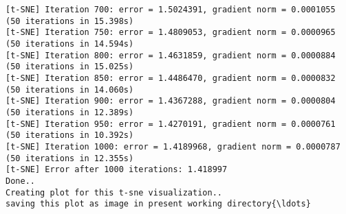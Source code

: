 \documentclass[11pt]{article}
\begin{document}
\begin{Verbatim}[commandchars=\\\{\}]
[t-SNE] Iteration 700: error = 1.5024391, gradient norm = 0.0001055 (50 iterations in 15.398s)
[t-SNE] Iteration 750: error = 1.4809053, gradient norm = 0.0000965 (50 iterations in 14.594s)
[t-SNE] Iteration 800: error = 1.4631859, gradient norm = 0.0000884 (50 iterations in 15.025s)
[t-SNE] Iteration 850: error = 1.4486470, gradient norm = 0.0000832 (50 iterations in 14.060s)
[t-SNE] Iteration 900: error = 1.4367288, gradient norm = 0.0000804 (50 iterations in 12.389s)
[t-SNE] Iteration 950: error = 1.4270191, gradient norm = 0.0000761 (50 iterations in 10.392s)
[t-SNE] Iteration 1000: error = 1.4189968, gradient norm = 0.0000787 (50 iterations in 12.355s)
[t-SNE] Error after 1000 iterations: 1.418997
Done..
Creating plot for this t-sne visualization..
saving this plot as image in present working directory{\ldots}

    \end{Verbatim}

    \begin{center}
    \end{center}
    { \hspace*{\fill} \\}
    
\end{document}
